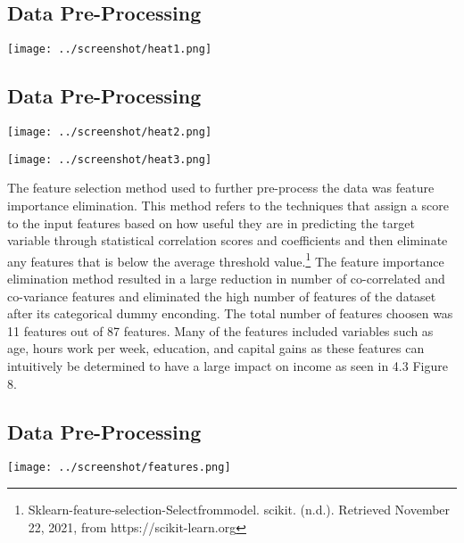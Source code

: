\documentclass[12pt]{article}
\begin{document}
\begin{multicols*}{2}
\subsection{Data Pre-Processing}
  \begin{center}
	\texttt{[image: ../screenshot/heat1.png]}
  \end{center}

  \subsection{Data Pre-Processing}
  \begin{center}
	\texttt{[image: ../screenshot/heat2.png]}

	\texttt{[image: ../screenshot/heat3.png]}
  \end{center}

  \hspace*{5mm} The feature selection method used to further pre-process the data was feature importance elimination. This method refers to the techniques that assign a score to the input features
  based on how useful they are in predicting the target variable through statistical correlation scores and coefficients and then eliminate any features that is below the average
  threshold value.\footnote[4]{Sklearn-feature-selection-Selectfrommodel. scikit. (n.d.). Retrieved November 22, 2021, from  https://scikit-learn.org} The feature importance elimination method resulted in a large
  reduction in number of co-correlated and co-variance features and eliminated the high number of features of the dataset after its categorical dummy enconding. 
  The total number of features choosen was 11 features out of 87 features. Many of the features included variables such as age, hours work per week, education, and capital gains as these features can intuitively be determined to have
  a large impact on income as seen in 4.3 Figure 8. 


  \subsection{Data Pre-Processing}
  \begin{center}
	\texttt{[image: ../screenshot/features.png]}
  \end{center}



\end{multicols*}
\end{document}
